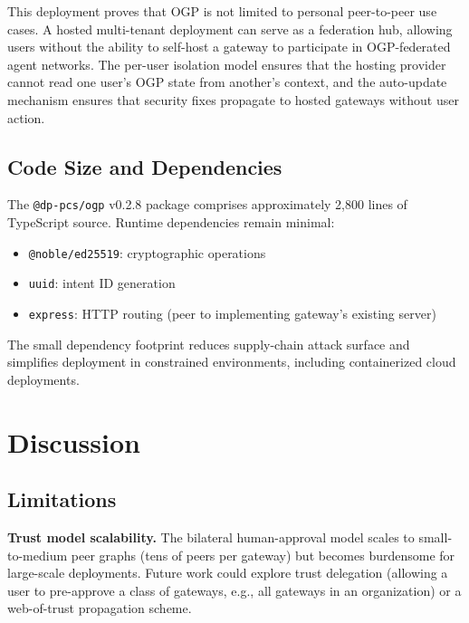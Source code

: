 \documentclass[conference]{IEEEtran}
\begin{document}
This deployment proves that OGP is not limited to personal peer-to-peer use cases. A hosted multi-tenant deployment can serve as a federation hub, allowing users without the ability to self-host a gateway to participate in OGP-federated agent networks. The per-user isolation model ensures that the hosting provider cannot read one user's OGP state from another's context, and the auto-update mechanism ensures that security fixes propagate to hosted gateways without user action.

\subsection{Code Size and Dependencies}

The \texttt{@dp-pcs/ogp} v0.2.8 package comprises approximately 2,800 lines of TypeScript source. Runtime dependencies remain minimal:

\begin{itemize}
  \item \texttt{@noble/ed25519}: cryptographic operations
  \item \texttt{uuid}: intent ID generation
  \item \texttt{express}: HTTP routing (peer to implementing gateway's existing server)
\end{itemize}

The small dependency footprint reduces supply-chain attack surface and simplifies deployment in constrained environments, including containerized cloud deployments.

\section{Discussion}
\label{sec:discussion}

\subsection{Limitations}

\textbf{Trust model scalability.} The bilateral human-approval model scales to small-to-medium peer graphs (tens of peers per gateway) but becomes burdensome for large-scale deployments. Future work could explore trust delegation (allowing a user to pre-approve a class of gateways, e.g., all gateways in an organization) or a web-of-trust propagation scheme.
\end{document}
